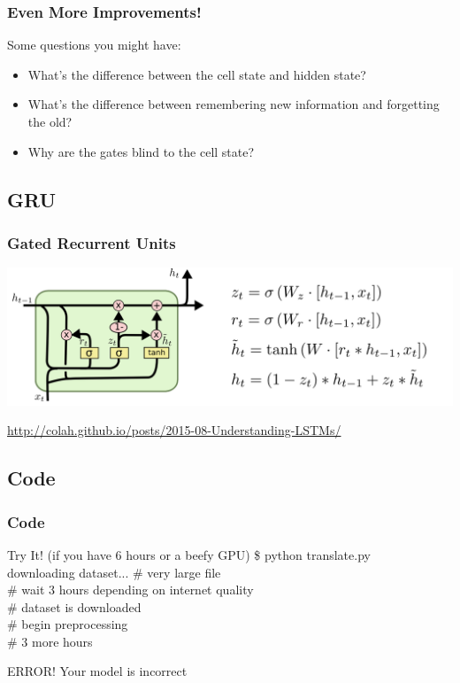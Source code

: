 \documentclass[pdf]{beamer}
\newenvironment{code}{\ttfamily\scriptsize\begin{block}}{\end{block}}
\begin{document}
\begin{frame}
  \frametitle{Even More Improvements!}
  Some questions you might have:
  \begin{itemize}
  \item What's the difference between the cell state and hidden state?
  \item What's the difference between remembering new information and
    forgetting the old?
  \item Why are the gates blind to the cell state?
  \end{itemize}
\end{frame}
\subsection{GRU}
\begin{frame}
  \frametitle{Gated Recurrent Units}
  \begin{center}
    \includegraphics[scale=0.4]{LSTM3-var-GRU.png}\\
  \end{center}
  \footnotesize  \url{http://colah.github.io/posts/2015-08-Understanding-LSTMs/}
\end{frame}
\subsection{Code}
\begin{frame}
  \frametitle{Code}
  \begin{code}{Try It! (if you have 6 hours or a beefy GPU)}
    \$ python translate.py\\
    downloading dataset... \# very large file\\
    \# wait 3 hours depending on internet quality\\
    \# dataset is downloaded\\
    \# begin preprocessing\\
    \# 3 more hours\\
  \end{code}
  \pause
  \begin{alertblock}{ERROR!}
    Your model is incorrect
  \end{alertblock}
\end{frame}
\end{document}
